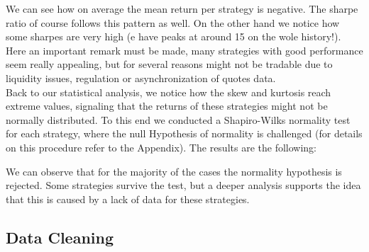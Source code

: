 \documentclass[12pt]{article} %
\numberwithin{equation}{subsection}
\begin{document}
We can see how on average the mean return per strategy is negative. The sharpe ratio of course follows this pattern as well. On the other hand we notice how some sharpes are very high (e have peaks at around 15 on the wole history!). Here an important remark must be made, many strategies with good performance seem really appealing, but for several reasons might not be tradable due to liquidity issues, regulation or asynchronization of quotes data.\\
Back to our statistical analysis, we notice how the skew and kurtosis reach extreme values, signaling that the returns of these strategies might not be normally distributed. To this end we conducted a Shapiro-Wilks normality test for each strategy, where the null Hypothesis of normality is challenged (for details on this procedure refer to the Appendix). The results are the following:

We can observe that for the majority of the cases the normality hypothesis is rejected. Some strategies survive the test, but a deeper analysis supports the idea that this is caused by a lack of data for these strategies. 


\subsection{Data Cleaning}
\end{document}
